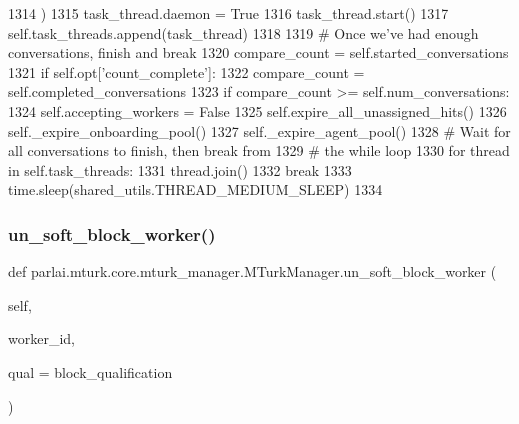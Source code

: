 \begin{DoxyCode}
1314                     )
1315                     task\_thread.daemon = \textcolor{keyword}{True}
1316                     task\_thread.start()
1317                     self.task\_threads.append(task\_thread)
1318 
1319             \textcolor{comment}{# Once we've had enough conversations, finish and break}
1320             compare\_count = self.started\_conversations
1321             \textcolor{keywordflow}{if} self.opt[\textcolor{stringliteral}{'count\_complete'}]:
1322                 compare\_count = self.completed\_conversations
1323             \textcolor{keywordflow}{if} compare\_count >= self.num\_conversations:
1324                 self.accepting\_workers = \textcolor{keyword}{False}
1325                 self.expire\_all\_unassigned\_hits()
1326                 self.\_expire\_onboarding\_pool()
1327                 self.\_expire\_agent\_pool()
1328                 \textcolor{comment}{# Wait for all conversations to finish, then break from}
1329                 \textcolor{comment}{# the while loop}
1330                 \textcolor{keywordflow}{for} thread \textcolor{keywordflow}{in} self.task\_threads:
1331                     thread.join()
1332                 \textcolor{keywordflow}{break}
1333             time.sleep(shared\_utils.THREAD\_MEDIUM\_SLEEP)
1334 
\end{DoxyCode}
\mbox{\label{classparlai_1_1mturk_1_1core_1_1mturk__manager_1_1MTurkManager_acaeeefcf862de982fdfcbeb26036aab9}} 
\subsubsection{\texorpdfstring{un\+\_\+soft\+\_\+block\+\_\+worker()}{un\_soft\_block\_worker()}}
{\footnotesize\ttfamily def parlai.\+mturk.\+core.\+mturk\+\_\+manager.\+M\+Turk\+Manager.\+un\+\_\+soft\+\_\+block\+\_\+worker (\begin{DoxyParamCaption}\item[{}]{self,  }\item[{}]{worker\+\_\+id,  }\item[{}]{qual = {\ttfamily \textquotesingle{}block\+\_\+qualification\textquotesingle{}} }\end{DoxyParamCaption})}

